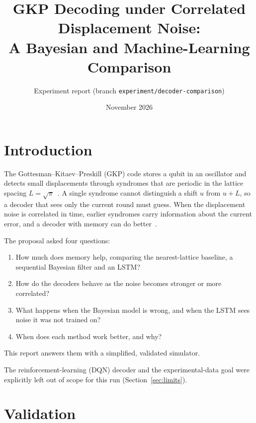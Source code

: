 \documentclass[11pt,letterpaper]{article}
\title{GKP Decoding under Correlated Displacement Noise:\\
A Bayesian and Machine-Learning Comparison}
\author{Experiment report (branch \texttt{experiment/decoder-comparison})}
\date{November 2026}
\begin{document}
\maketitle



\tableofcontents

\section{Introduction}

The Gottesman--Kitaev--Preskill (GKP) code stores a qubit in an oscillator
and detects small displacements through syndromes that are periodic in the
lattice spacing $L=\sqrt\pi$~\cite{gkp,grimsmo}. A single syndrome cannot
distinguish a shift $u$ from $u+L$, so a decoder that sees only the current
round must guess. When the displacement noise is correlated in time, earlier
syndromes carry information about the current error, and a decoder with
memory can do better~\cite{wan,puviani}.

The proposal asked four questions:
\begin{enumerate}
  \item How much does memory help, comparing the nearest-lattice baseline, a
    sequential Bayesian filter and an LSTM?
  \item How do the decoders behave as the noise becomes stronger or more
    correlated?
  \item What happens when the Bayesian model is wrong, and when the LSTM sees
    noise it was not trained on?
  \item When does each method work better, and why?
\end{enumerate}
This report answers them with a simplified, validated simulator.

The reinforcement-learning (DQN) decoder and the experimental-data goal were
explicitly left out of scope for this run (Section~\ref{sec:limits}).



\section{Validation}\label{sec:validation}
\end{document}
